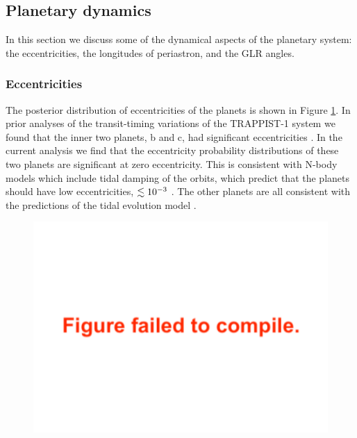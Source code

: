 \documentclass[twocolumn]{aastex63}
\begin{document}
\subsection{Planetary dynamics}



In this section we discuss some of the dynamical aspects of the planetary system: the  eccentricities, the longitudes of periastron, and the GLR angles.

\subsubsection{Eccentricities}

The posterior distribution of eccentricities of the planets is shown
in Figure \ref{fig:eccentricity_posterior}.  In prior analyses of
the transit-timing variations of the TRAPPIST-1 system we found that
the inner two planets, b and c, had significant eccentricities \citep{Grimm2018}.
In the current analysis we find that the eccentricity probability
distributions of these two planets are significant at zero eccentricity.
This is consistent with N-body models which include tidal damping of
the orbits, which predict that the planets should have low eccentricities,
$\lesssim 10^{-3}$ \citep{Luger2017a,Turbet2018}.  The other planets are
all consistent with the predictions of the tidal evolution model
\citep{Luger2017b}.

\begin{figure}
    \centering
    \includegraphics[width=\hsize]{figures/eccentricity_posterior.pdf}
    \label{fig:eccentricity_posterior}
\end{figure}
\end{document}
